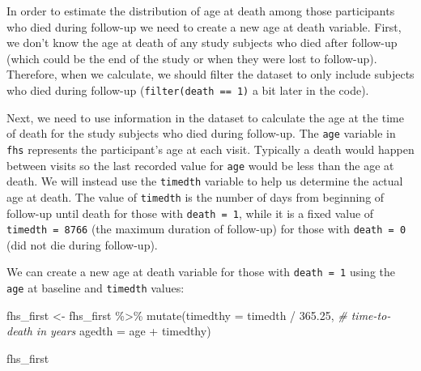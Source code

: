 \documentclass[
]{book}
\newenvironment{Shaded}{\begin{snugshade}}{\end{snugshade}}
\newcommand{\AttributeTok}[1]{\textcolor[rgb]{0.77,0.63,0.00}{#1}}
\newcommand{\CommentTok}[1]{\textcolor[rgb]{0.56,0.35,0.01}{\textit{#1}}}
\newcommand{\FloatTok}[1]{\textcolor[rgb]{0.00,0.00,0.81}{#1}}
\newcommand{\FunctionTok}[1]{\textcolor[rgb]{0.00,0.00,0.00}{#1}}
\newcommand{\NormalTok}[1]{#1}
\newcommand{\OtherTok}[1]{\textcolor[rgb]{0.56,0.35,0.01}{#1}}
\newcommand{\SpecialCharTok}[1]{\textcolor[rgb]{0.00,0.00,0.00}{#1}}
\begin{document}
In order to estimate the distribution of age at death among those participants who died during follow-up we need to create a new age at death variable. First, we don't know the age at death of any study subjects who died after follow-up (which could be the end of the study or when they were lost to follow-up). Therefore, when we calculate, we should filter the dataset to only include subjects who died during follow-up (\texttt{filter(death\ ==\ 1)} a bit later in the code).

Next, we need to use information in the dataset to calculate the age at the time of death for the study subjects who died during follow-up.
The \texttt{age} variable in \texttt{fhs} represents the participant's age at each visit. Typically a death would happen between visits so the last recorded value for \texttt{age} would be less than the age at death. We will instead use the \texttt{timedth} variable to help us determine the actual age at death. The value of \texttt{timedth} is the number of days from beginning of follow-up until death for those with \texttt{death\ =\ 1}, while it is a fixed value of \texttt{timedth\ =\ 8766} (the maximum duration of follow-up) for those with \texttt{death\ =\ 0} (did not die during follow-up).

We can create a new age at death variable for those with \texttt{death\ =\ 1} using the \texttt{age} at baseline and \texttt{timedth} values:

\begin{Shaded}
\begin{Highlighting}[]
\NormalTok{fhs\_first }\OtherTok{\textless{}{-}}\NormalTok{ fhs\_first }\SpecialCharTok{\%\textgreater{}\%} 
  \FunctionTok{mutate}\NormalTok{(}\AttributeTok{timedthy =}\NormalTok{ timedth }\SpecialCharTok{/} \FloatTok{365.25}\NormalTok{, }\CommentTok{\# time{-}to{-}death in years}
         \AttributeTok{agedth =}\NormalTok{ age }\SpecialCharTok{+}\NormalTok{ timedthy) }

\NormalTok{fhs\_first }
\end{Highlighting}
\end{Shaded}
\end{document}

